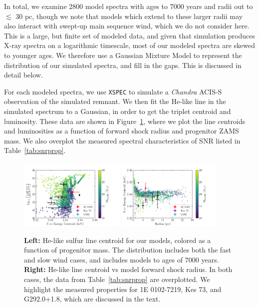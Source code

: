 \documentclass[twocolumn]{aastex631}
\begin{document}
In total, we examine 2800 model spectra with ages to 7000 years and radii out to $\lesssim$ 30 pc, though we note that models which extend to these larger radii may also interact with swept-up main sequence wind, which we do not consider here. This is a large, but finite set of
modeled data, and given that simulation produces X-ray spectra on a logarithmic
timescale, most of our modeled spectra are skewed to younger ages. We therefore 
use a Gaussian Mixture Model to represent the distribution of our simulated spectra,
and fill in the gaps. This is discussed in detail below. 

For each modeled spectra, we use \texttt{XSPEC} to simulate a %
{\it Chandra}
ACIS-S observation of the simulated remnant. We then fit the He-like line in the
simulated spectrum to a Gaussian, in order to get the triplet centroid and luminosity. These data are shown in Figure~\ref{fig:s_properties}, where we plot the line centroids and luminosities as a function of forward shock radius and progenitor ZAMS mass. We also overplot the measured spectral characteristics of SNR listed in Table~\ref{tab:snrprop}.

\begin{figure}
    \centering
    \includegraphics[width=0.45\textwidth]{s_line_vs_lx_vs_ZAMS.png}
    \includegraphics[width=0.45\textwidth]{s_radius_vs_line_vs_ZAMS.png}
    \caption{{\bf Left:} He-like sulfur line centroid for our models, colored as a function of progenitor mass. The distribution includes both the fast and slow wind cases, and includes models to ages of 7000 years. {\bf Right:} He-like line centroid vs model forward shock radius. In both cases, the data from Table~\ref{tab:snrprop} are overplotted. We highlight the measured properties for 1E 0102-7219, Kes 73, and G292.0+1.8, which are discussed in the text.
    \label{fig:s_properties}}
\end{figure}
\end{document}
